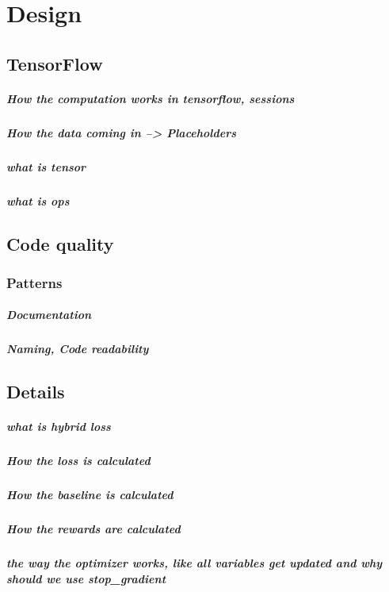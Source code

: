 \chapter{Design}
\label{ch:implementation}


\section{TensorFlow}
\paragraph{How the computation works in tensorflow, sessions}
\paragraph{How the data coming in --> Placeholders}

\paragraph{what is tensor}
\paragraph{what is ops}

\section{Code quality}

\subsection{Patterns}
\paragraph{Documentation}
\paragraph{Naming, Code readability}

\section{Details}
\paragraph{what is hybrid loss}
\paragraph{How the loss is calculated}
\paragraph{How the baseline is calculated}
\paragraph{How the rewards are calculated}
\paragraph{
	the way the optimizer works, like all variables get updated and
	why should we use stop_gradient
}
